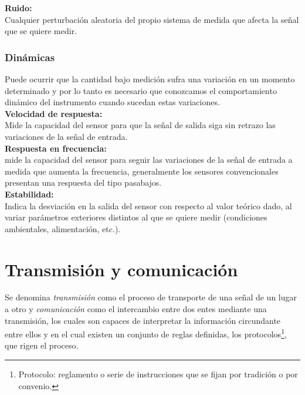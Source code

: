 \textbf{Ruido:}\\

Cualquier perturbación aleatoria del propio sistema de medida que afecta la señal 
que se quiere medir. \\

\subsubsection{Dinámicas}

Puede ocurrir que la cantidad bajo medición sufra una variación en un momento determinado y por lo tanto es necesario que conozcamos el comportamiento dinámico del instrumento 
cuando sucedan estas variaciones.\\

\textbf{Velocidad de respuesta:}\\

Mide la capacidad del sensor para que la señal de salida siga sin 
retrazo las variaciones de la señal de entrada. \\

\textbf{Respuesta en frecuencia:}\\

 mide la capacidad del sensor para seguir las variaciones de la 
señal  de  entrada  a  medida  que  aumenta  la  frecuencia,  generalmente  los  sensores 
convencionales presentan una respuesta del tipo pasabajos.\\

\textbf{Estabilidad:}\\

Indica  la  desviación  en  la  salida  del  sensor  con  respecto  al  valor  teórico 
dado,  al  variar  parámetros  exteriores  distintos  al  que  se  quiere  medir  (condiciones 
ambientales, alimentación, etc.). \\


\section{Transmisión y comunicación}
\label{sec:transmisión}

Se denomina \emph{transmisión} como el proceso de transporte de una señal de un lugar a otro y \emph{comunicación} como el intercambio entre dos entes mediante una transmisión, los cuales son capaces de
interpretar la información circundante entre ellos y en el cual existen un conjunto de reglas definidas, los protocolos\footnote{Protocolo: reglamento o serie de instrucciones que se fijan por tradición o por convenio. },
que rigen el proceso.

